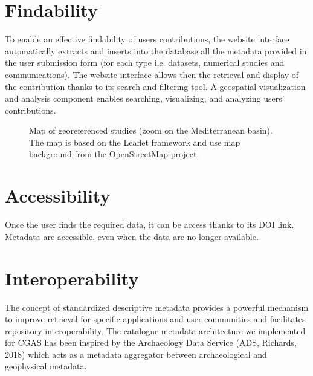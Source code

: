 \documentclass[letterpaper,10pt,english]{sphinxmanual}
\begin{document}
\section{Findability}
\label{\detokenize{FAIR:findability}}
\sphinxAtStartPar
To enable an effective findability of users contributions, the website interface automatically extracts and inserts into the database all the metadata provided in the user submission form (for each type i.e. datasets, numerical studies and communications). The website interface allows then the retrieval and display of the contribution thanks to its search and filtering tool. A geospatial visualization and analysis component enables searching, visualizing, and analyzing users’ contributions.

\begin{figure}[htbp]
\centering
\capstart

\noindent{}
\caption{Map of georeferenced studies (zoom on the Mediterranean basin). The map is based on the Leaflet framework and use map background from the OpenStreetMap project.}\label{\detokenize{FAIR:id1}}\label{\detokenize{FAIR:importing}}\end{figure}


\section{Accessibility}
\label{\detokenize{FAIR:accessibility}}
\sphinxAtStartPar
Once the user finds the required data, it can be access thanks to its DOI link. Metadata are accessible, even when the data are no longer available.


\section{Interoperability}
\label{\detokenize{FAIR:interoperability}}
\sphinxAtStartPar
The concept of standardized descriptive metadata provides a powerful mechanism to improve retrieval for specific applications and user communities and facilitates repository interoperability. The catalogue metadata architecture we implemented for CGAS has been inspired by the Archaeology Data Service (ADS, Richards, 2018) which acts as a metadata aggregator between archaeological and geophysical metadata.
\end{document}
